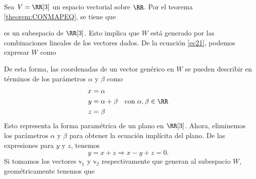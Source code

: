 \begin{examplebox}{}{}
    Sea $V = \RR[3]$ un espacio vectorial sobre $\RR$. Por el teorema \ref{theorem:CONMAPEQ}, se tiene que
    \begin{matriz}
         \label{ec21}
    \end{matriz}
    es un subespacio de $\RR[3]$. Esto implica que $W$ está generado por las combinaciones lineales de los vectores dados. De la ecuación \eqref{ec21}, podemos expresar $W$ como
    \begin{matrizn}
    \end{matrizn}
    De esta forma, las coordenadas de un vector genérico en $W$ se pueden describir en términos de los parámetros $\alpha$ y $\beta$ como
    $$\begin{aligned}
        x & = \alpha \\
        y & = \alpha + \beta \\
        z & = \beta
    \end{aligned} \quad \text{con } \alpha, \beta \in \RR$$
    Esto representa la forma paramétrica de un plano en $\RR[3]$. Ahora, eliminemos los parámetros $\alpha$ y $\beta$ para obtener la ecuación implícita del plano. De las expresiones para $y$ y $z$, tenemos
    $$y = x + z \Longrightarrow x - y + z = 0.$$
    Si tomamos los vectores $\mathbb{v_1}$ y $\mathbb{v_2}$ respectivamente que generan al subespacio $W$, geométricamente tenemos que
    \begin{center}
\end{center}
\end{examplebox}
